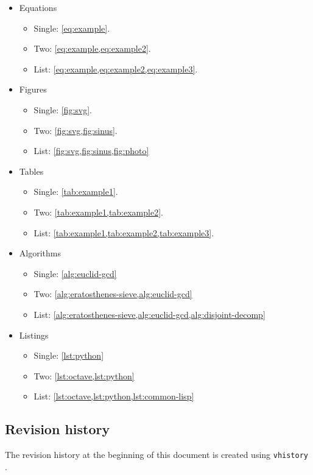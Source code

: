 \begin{itemize}
\item Equations
\begin{itemize}
  \item Single: \cref{eq:example}.
  \item Two: \cref{eq:example,eq:example2}.
  \item List: \cref{eq:example,eq:example2,eq:example3}.
\end{itemize}
\item Figures
\begin{itemize}
  \item Single: \cref{fig:svg}.
  \item Two: \cref{fig:svg,fig:sinus}.
  \item List: \cref{fig:svg,fig:sinus,fig:photo}
\end{itemize}
\item Tables
\begin{itemize}
  \item Single: \cref{tab:example1}.
  \item Two: \cref{tab:example1,tab:example2}.
  \item List: \cref{tab:example1,tab:example2,tab:example3}.
\end{itemize}
\item Algorithms
\begin{itemize}
  \item Single: \cref{alg:euclid-gcd}
  \item Two: \cref{alg:eratosthenes-sieve,alg:euclid-gcd}
  \item List: \cref{alg:eratosthenes-sieve,alg:euclid-gcd,alg:disjoint-decomp}
\end{itemize}
\item Listings
\begin{itemize}
  \item Single: \cref{lst:python}
  \item Two: \cref{lst:octave,lst:python}
  \item List: \cref{lst:octave,lst:python,lst:common-lisp}
\end{itemize} \end{itemize}

\subsection{Revision history}
The revision history at the beginning of this document is created using
\lstinline{vhistory} \cite{vhistory}.
